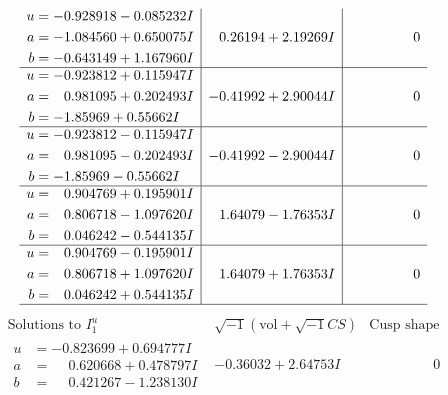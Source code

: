 \documentclass[1p]{elsarticle_modified}
\theoremstyle{definition}
\newcommand{\I}{\sqrt{-1}}
\begin{document}
$$\begin{array}{c|c|c}
\begin{aligned}
u &= -0.928918 - 0.085232 I \\
a &= -1.084560 + 0.650075 I \\
b &= -0.643149 + 1.167960 I\end{aligned}
 & \phantom{-}0.26194 + 2.19269 I & \phantom{-0.000000 } 0 \\ \hline\begin{aligned}
u &= -0.923812 + 0.115947 I \\
a &= \phantom{-}0.981095 + 0.202493 I \\
b &= -1.85969 + 0.55662 I\end{aligned}
 & -0.41992 + 2.90044 I & \phantom{-0.000000 } 0 \\ \hline\begin{aligned}
u &= -0.923812 - 0.115947 I \\
a &= \phantom{-}0.981095 - 0.202493 I \\
b &= -1.85969 - 0.55662 I\end{aligned}
 & -0.41992 - 2.90044 I & \phantom{-0.000000 } 0 \\ \hline\begin{aligned}
u &= \phantom{-}0.904769 + 0.195901 I \\
a &= \phantom{-}0.806718 - 1.097620 I \\
b &= \phantom{-}0.046242 - 0.544135 I\end{aligned}
 & \phantom{-}1.64079 - 1.76353 I & \phantom{-0.000000 } 0 \\ \hline\begin{aligned}
u &= \phantom{-}0.904769 - 0.195901 I \\
a &= \phantom{-}0.806718 + 1.097620 I \\
b &= \phantom{-}0.046242 + 0.544135 I\end{aligned}
 & \phantom{-}1.64079 + 1.76353 I & \phantom{-0.000000 } 0\\
 \hline 
 \end{array}$$\newpage$$\begin{array}{c|c|c}  
\text{Solutions to }I^u_{1}& \I (\text{vol} + \sqrt{-1}CS) & \text{Cusp shape}\\
 \hline 
\begin{aligned}
u &= -0.823699 + 0.694777 I \\
a &= \phantom{-}0.620668 + 0.478797 I \\
b &= \phantom{-}0.421267 - 1.238130 I\end{aligned}
 & -0.36032 + 2.64753 I & \phantom{-0.000000 } 0 \\ \hline\begin{aligned}

\end{aligned}
\end{array}$$
\end{document}
